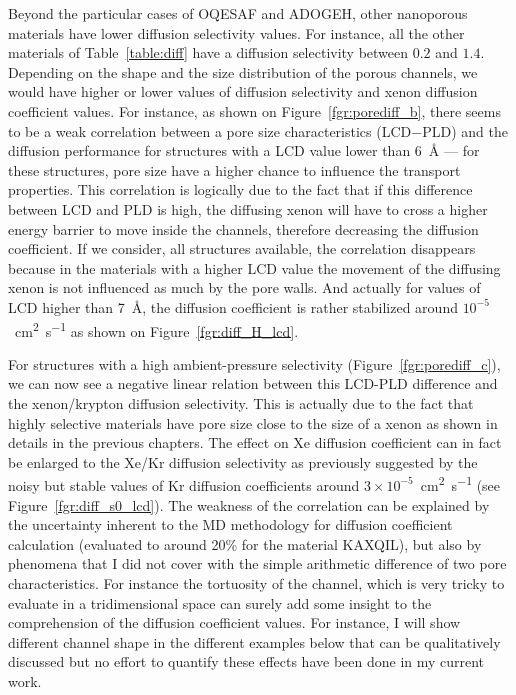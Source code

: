 \documentclass[main]{subfiles}
\begin{document}
Beyond the particular cases of OQESAF and ADOGEH, other nanoporous materials have lower diffusion selectivity values. For instance, all the other materials of Table~\ref{table:diff} have a diffusion selectivity between $0.2$ and $1.4$. Depending on the shape and the size distribution of the porous channels, we would have higher or lower values of diffusion selectivity and xenon diffusion coefficient values. For instance, as shown on Figure~\ref{fgr:porediff_b}, there seems to be a weak correlation between a pore size characteristics (LCD$-$PLD) and the diffusion performance for structures with a LCD value lower than \SI{6}{\angstrom} --- for these structures, pore size have a higher chance to influence the transport properties. This correlation is logically due to the fact that if this difference between LCD and PLD is high, the diffusing xenon will have to cross a higher energy barrier to move inside the channels, therefore decreasing the diffusion coefficient. If we consider, all structures available, the correlation disappears because in the materials with a higher LCD value the movement of the diffusing xenon is not influenced as much by the pore walls. And actually for values of LCD higher than \SI{7}{\angstrom}, the diffusion coefficient is rather stabilized around $10^{-5}$~\si{\square\cm\per\s} as shown on Figure~\ref{fgr:diff_H_lcd}. 

For structures with a high ambient-pressure selectivity (Figure~\ref{fgr:porediff_c}), we can now see a negative linear relation between this LCD-PLD difference and the xenon/krypton diffusion selectivity. This is actually due to the fact that highly selective materials have pore size close to the size of a xenon as shown in details in the previous chapters. The effect on Xe diffusion coefficient can in fact be enlarged to the Xe/Kr diffusion selectivity as previously suggested by the noisy but stable values of Kr diffusion coefficients around $3\times10^{-5}$~\si{\square\cm\per\s} (see Figure~\ref{fgr:diff_s0_lcd}). The weakness of the correlation can be explained by the uncertainty inherent to the MD methodology for diffusion coefficient calculation (evaluated to around {20\%} for the material KAXQIL), but also by phenomena that I did not cover with the simple arithmetic difference of two pore characteristics. For instance the tortuosity of the channel, which is very tricky to evaluate in a tridimensional space can surely add some insight to the comprehension of the diffusion coefficient values. For instance, I will show different channel shape in the different examples below that can be qualitatively discussed but no effort to quantify these effects have been done in my current work.
\end{document}
